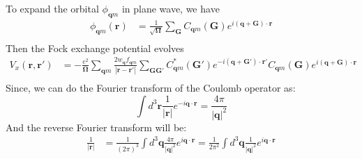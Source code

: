 \documentclass[a4paper,12pt]{article}
\begin{document}
To expand the orbital $\phi_{\boldsymbol{q}m}$ in plane wave, we have
\begin{equation}
    \begin{split}
        \phi_{\boldsymbol{q}m}(\boldsymbol{r})&=\frac{1}{\sqrt{\boldsymbol{\Omega}}}\sum_{\boldsymbol{G}}
        C_{\boldsymbol{q}m}(\boldsymbol{G})e^{i(\boldsymbol{q}+\boldsymbol{G})\cdot \boldsymbol{r}}\\
    \end{split}
\end{equation}
Then the Fock exchange potential evolves 
\begin{equation}
    \begin{split}
        V_{x}(\boldsymbol{r},\boldsymbol{r}')&=-\frac{e^2}{\boldsymbol{\Omega}}\sum_{\boldsymbol{q}m}
        \frac{2w_{\boldsymbol{q}}f_{\boldsymbol{q}m}}{{|\boldsymbol{r}-\boldsymbol{r}'|}}
        \sum_{\boldsymbol{G}\boldsymbol{G}'}
        C_{\boldsymbol{q}m}^{*}(\boldsymbol{G}')e^{-i(\boldsymbol{q}+\boldsymbol{G}')\cdot \boldsymbol{r}'}
        C_{\boldsymbol{q}m}(\boldsymbol{G})e^{i(\boldsymbol{q}+\boldsymbol{G})\cdot \boldsymbol{r}}\\
    \end{split}
\end{equation}
Since, we can do the Fourier transform of the Coulomb operator as:
\begin{equation}
    \int d^3\boldsymbol{r}\frac{1}{|\boldsymbol{r}|}e^{-i\boldsymbol{q}\cdot\boldsymbol{r}}=\frac{4\pi}{|\boldsymbol{q}|^2}
\end{equation}
And the reverse Fourier transform will be:
\begin{equation}
    \begin{split}
        \frac{1}{|\boldsymbol{r}|}&=\frac{1}{(2\pi)^3}\int d^3\boldsymbol{q}\frac{4\pi}{|\boldsymbol{q}|^2}e^{i\boldsymbol{q}\cdot\boldsymbol{r}}
        =\frac{1}{2\pi^2}\int d^3\boldsymbol{q}\frac{1}{|\boldsymbol{q}|^2}e^{i\boldsymbol{q}\cdot\boldsymbol{r}}
    \end{split}
\end{equation}
\end{document}
